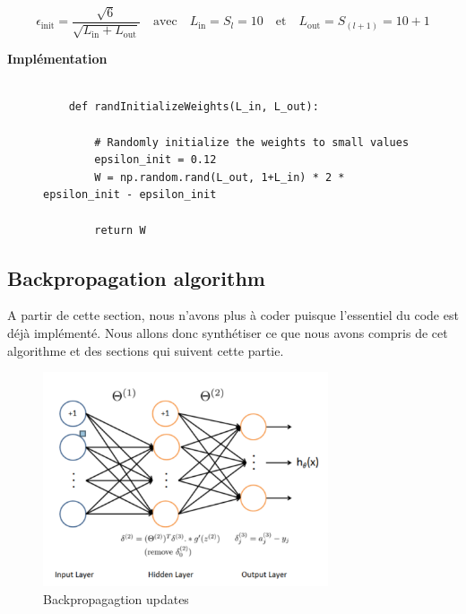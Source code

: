 \begin{equation}
    \epsilon_{\text{init}} = \frac{\sqrt{6}}{\sqrt{L_{\text{in}} + L_{\text{out}}}} \quad \text{avec} \quad L_{\text{in}} = S_l = 10 \quad \text{et} \quad L_{\text{out}} = S_{(l+1)} = 10+1
\end{equation}

\noindent
\textbf{Implémentation}

\begin{figure}[!h]
    \begin{verbatim}

    def randInitializeWeights(L_in, L_out):

        # Randomly initialize the weights to small values
        epsilon_init = 0.12
        W = np.random.rand(L_out, 1+L_in) * 2 * epsilon_init - epsilon_init

        return W
    \end{verbatim}   
\end{figure}

\subsection{Backpropagation algorithm}

A partir de cette section, nous n'avons plus à coder puisque l'essentiel du code est déjà implémenté.
Nous allons donc synthétiser ce que nous avons compris de cet algorithme et des sections qui suivent
cette partie.

\begin{figure}[!h]
    \begin{center}
        \includegraphics[width=0.75\textwidth]{./img/3.3.png}
        \caption{\label{fig:3.3}Backpropagagtion updates}  
    \end{center}
\end{figure}


